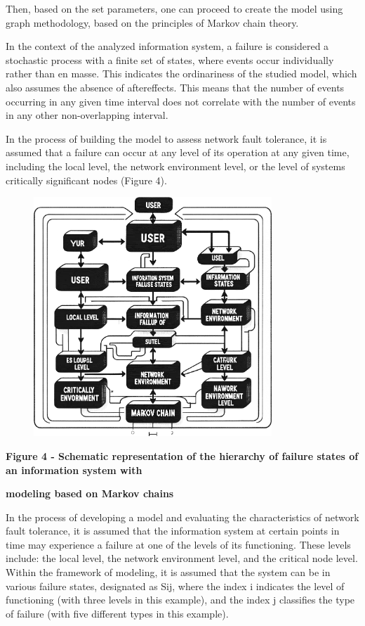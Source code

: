 Then, based on the set parameters, one can proceed to create the model
using graph methodology, based on the principles of Markov chain theory.

In the context of the analyzed information system, a failure is
considered a stochastic process with a finite set of states, where
events occur individually rather than en masse. This indicates the
ordinariness of the studied model, which also assumes the absence of
aftereffects. This means that the number of events occurring in any
given time interval does not correlate with the number of events in any
other non-overlapping interval.

In the process of building the model to assess network fault tolerance,
it is assumed that a failure can occur at any level of its operation at
any given time, including the local level, the network environment
level, or the level of system\textquotesingle s critically significant
nodes (Figure 4).

\begin{figure}[H]
	\centering
	\includegraphics[width=0.8\textwidth]{assets/46}
	\caption*{}
\end{figure}

\textbf{Figure 4 - Schematic representation of the hierarchy of failure
states of an information system with}

\textbf{modeling based on Markov chains}

In the process of developing a model and evaluating the characteristics
of network fault tolerance, it is assumed that the information system at
certain points in time may experience a failure at one of the levels of
its functioning. These levels include: the local level, the network
environment level, and the critical node level. Within the framework of
modeling, it is assumed that the system can be in various failure
states, designated as Sij, where the index i indicates the level of
functioning (with three levels in this example), and the index j
classifies the type of failure (with five different types in this
example).

